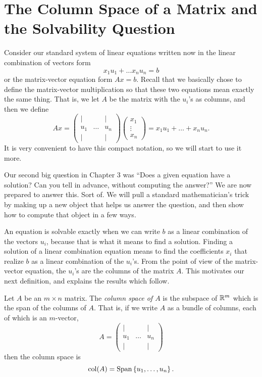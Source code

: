 \documentclass[00-livre-main.tex]{subfiles}
\begin{document}
\section*{The Column Space of a Matrix and the Solvability Question}

Consider our standard system of linear equations written now in the linear combination of vectors form
\[
x_1 u_1 + \dots x_n u_n = b
\]
or the matrix-vector equation form $Ax=b$. Recall that we basically chose to define the matrix-vector multiplication so that these two equations mean exactly the same thing. That is, we let $A$ be the matrix with the $u_i$'s as columns, and then we define
\[
A x = \begin{pmatrix} | &   & | \\ u_1 &  \dots & u_n \\ | &  & | \end{pmatrix}\begin{pmatrix} x_1 \\  \vdots \\ x_n \end{pmatrix} = x_1 u_1 + \dots + x_n u_n .
\]
It is very convenient to have this compact notation, so we will start to use it more.

Our second big question in Chapter 3 was ``Does a given equation have a solution? Can you tell in advance, without computing the answer?'' We are now prepared to answer this. Sort of. We will pull a standard mathematician's trick by making up a new object that helps us answer the question, and then show how to compute that object in a few ways.

An equation is solvable exactly when we can write $b$ as a linear combination of the vectors $u_i$, because that is what it means to find a solution. Finding a solution of a linear combination equation means to find the coefficients $x_i$ that realize $b$ as a linear combination of the $u_i$'s. From the point of view of the matrix-vector equation, the $u_i$'s are the columns of the matrix $A$. This motivates our next definition, and explains the results which follow.

\begin{definition} Let $A$ be an $m\times n$ matrix. The \emph{column space of $A$} is the subspace of $\mathbb{R}^m$ which is the span of the columns of $A$. That is, if we write $A$
as a bundle of columns, each of which is an $m$-vector,
\[
A = \begin{pmatrix} | &   & | \\ u_1 &  \dots & u_n \\ | &  & | \end{pmatrix}
\]
then the column space is
\[
\mathrm{col}(A) = \mathrm{Span}\left\{ u_1,\ldots,u_n \right\}.
\]
\end{definition}
\end{document}
